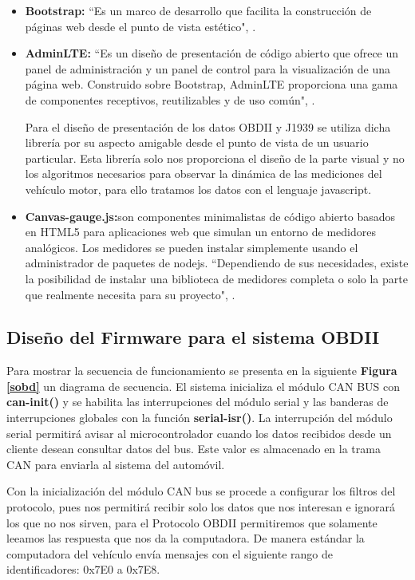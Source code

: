 \begin{itemize}
	\item {\bfseries Bootstrap: } ``Es un marco de desarrollo que facilita la construcción de páginas web desde el punto de vista estético", \cite{boot}. %
	\item {\bfseries AdminLTE: } ``Es un diseño de presentación  de código abierto que ofrece un  panel de administración y  un panel de control para la visualización de una página web. Construido sobre Bootstrap, AdminLTE proporciona una gama de componentes receptivos, reutilizables y de uso común", \cite{admin}. %
	
	Para el diseño de presentación de los datos OBDII y J1939 se utiliza dicha librería por su aspecto amigable desde el punto de vista de un usuario particular. Esta librería solo nos proporciona el diseño de la parte visual y no los algoritmos necesarios para observar la dinámica de las mediciones del vehículo motor, para ello tratamos los datos con el lenguaje javascript. 
	
	\item {\bfseries Canvas-gauge.js:}son componentes minimalistas de código abierto basados en HTML5 para aplicaciones web que simulan un entorno de medidores analógicos. Los medidores  se pueden instalar simplemente usando el administrador de paquetes de nodejs. ``Dependiendo de sus necesidades, existe la posibilidad de instalar una biblioteca de medidores completa o solo la parte que realmente necesita para su proyecto", \cite{gauge}. %
	
\end{itemize}


\subsection{Diseño del Firmware para el sistema OBDII}

Para mostrar la secuencia de funcionamiento se presenta en la siguiente  \textbf{Figura \ref{sobd}} un diagrama de secuencia. El sistema inicializa el módulo CAN BUS con {\bfseries can-init()} y se habilita las interrupciones del módulo serial y las banderas de interrupciones globales con la función {\bfseries serial-isr()}. La interrupción del módulo serial permitirá avisar al microcontrolador cuando los datos recibidos desde un cliente desean consultar datos del bus. Este valor es almacenado en la trama CAN para enviarla al sistema del automóvil.

Con la inicialización del módulo CAN bus se procede a configurar los filtros del protocolo, pues nos permitirá recibir solo los datos que nos interesan e ignorará los que no nos sirven, para el Protocolo OBDII permitiremos que solamente leeamos las respuesta que nos da la computadora. De manera estándar la computadora del vehículo envía mensajes con el siguiente rango de identificadores: 0x7E0 a 0x7E8. 

